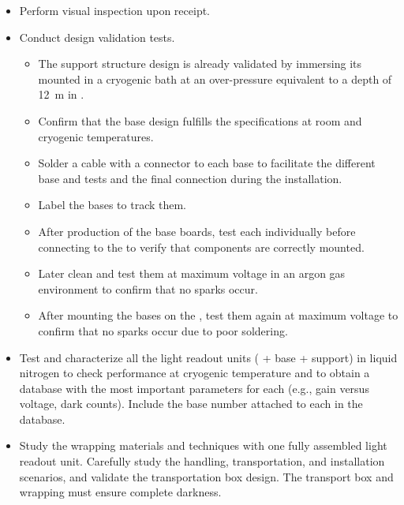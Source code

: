 \begin{itemize}
\item Perform visual inspection upon receipt. %

\item Conduct design validation tests. 
\begin{itemize}
\item The  support structure design is already validated by immersing its mounted  in a cryogenic bath %
at an over-pressure equivalent to a depth of \SI{12}{m} in . %
\item Confirm that the  base design fulfills the specifications at room and cryogenic temperatures. 
\item Solder a cable with a  connector %
to each  base to facilitate the different base and  tests and the final  connection during the installation. 
\item Label the  bases %
to track them. 
\item After production of the  base boards, test each individually %
before connecting to the  to verify that components are correctly mounted. 
\item Later clean and test them %
at maximum voltage in an argon gas environment to confirm that no sparks occur. 
\item After mounting the bases on the , test them again %
at maximum voltage to confirm that no sparks occur due to poor soldering.
\end{itemize}
\item Test and characterize all the light readout units ( + base + support) %
 in liquid nitrogen to check performance at cryogenic temperature and to obtain a database with the most important parameters for each  (e.g., gain versus voltage, dark counts). Include the  base number attached to each  %
 in the database.

\item Study the wrapping materials and techniques %
with one fully assembled light readout unit. Carefully study the handling, transportation, and installation scenarios,%
and validate the transportation box design. %
The transport box and  wrapping must ensure complete darkness.


\end{itemize}
